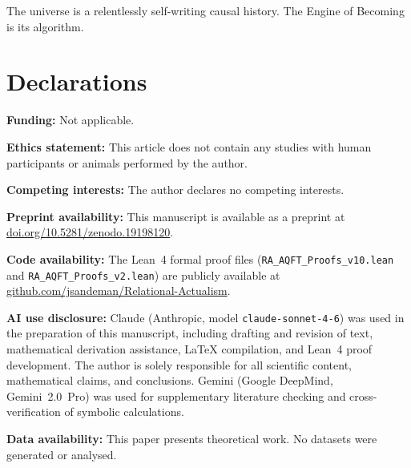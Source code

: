\documentclass[11pt,a4paper]{article}
\theoremstyle{plain}
\theoremstyle{definition}
\theoremstyle{remark}
\begin{document}
The universe is a relentlessly self-writing causal history.
The Engine of Becoming is its algorithm.


\section*{Declarations}
\textbf{Funding:} Not applicable.

\textbf{Ethics statement:} This article does not contain any studies with human participants or animals performed by the author.

\quad
\textbf{Competing interests:} The author declares no competing interests.

\textbf{Preprint availability:} This manuscript is available as a preprint at
\href{https://doi.org/10.5281/zenodo.19198120}{doi.org/10.5281/zenodo.19198120}.

\textbf{Code availability:} The Lean~4 formal proof files
(\texttt{RA\_AQFT\_Proofs\_v10.lean} and \texttt{RA\_AQFT\_Proofs\_v2.lean})
are publicly available at
\href{https://github.com/jsandeman/Relational-Actualism}{github.com/jsandeman/Relational-Actualism}.

\textbf{AI use disclosure:} Claude (Anthropic, model \texttt{claude-sonnet-4-6}) was used in the preparation of this manuscript, including drafting and revision of text, mathematical derivation assistance, \LaTeX{} compilation, and Lean~4 proof development. The author is solely responsible for all scientific content, mathematical claims, and conclusions. Gemini (Google DeepMind, Gemini~2.0~Pro) was used for supplementary literature checking and cross-verification of symbolic calculations.


\textbf{Data availability:} This paper presents theoretical work. No datasets
were generated or analysed.
\end{document}
